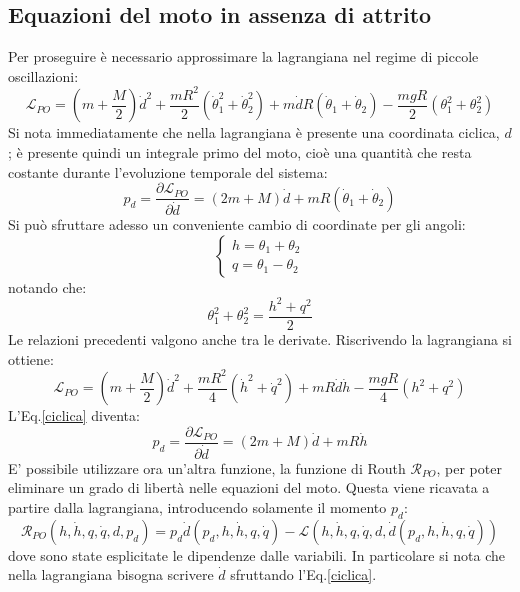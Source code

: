 \documentclass[11pt, a4paper, twoside]{article}
\begin{document}
\subsection{Equazioni del moto in assenza di attrito}
Per proseguire è necessario approssimare
la lagrangiana nel regime di piccole oscillazioni:
\begin{equation}
\mathcal{L}_{PO} =  \left(m+ \frac{M}{2}\right) \dot{d}^2 + \frac{m R^2}{2}  (\dot\theta_1^2 + \dot\theta_2^2) + m \dot{d} R (\dot \theta_1 + \dot \theta_2) - \frac{m gR}{2} (\theta_1^2 + \theta_2^2)
\label{lagrangianapo}
\end{equation}
Si nota immediatamente che nella lagrangiana è presente una coordinata ciclica, $d$; è presente
 quindi un integrale primo del moto, cioè una quantità che resta costante durante 
l'evoluzione temporale del sistema:
\begin{equation}
p_d = \frac{\partial \mathcal{L}_{PO}}{\partial \dot{d}} =(2m+M) \dot d + m R (\dot\theta_1 + \dot \theta_2)
\label{ciclica}
\end{equation}
Si può sfruttare adesso un conveniente cambio di coordinate per gli angoli:
\begin{equation}
\left\{\begin{array}{lr}
  h = \theta_1 + \theta_2 \\
  q = \theta_1 - \theta_2
\end{array}\right.
\label{definizionehq}
\end{equation}
notando che:
$$
  \theta_1^2 + \theta_2^2 = \frac{h^2 +q^2}{2}
$$ 
Le relazioni precedenti valgono anche tra le derivate.
Riscrivendo la lagrangiana si ottiene:
$$
\mathcal{L}_{PO} =  \left(m+ \frac{M}{2}\right) \dot{d}^2 + \frac{mR^2}{4}  (\dot{h}^2 + \dot{q}^2) + m  R \dot{d}\dot{h} - \frac{mgR}{4}(h^2 + q^2)
$$
L'Eq.\ref{ciclica} diventa:
\begin{equation*}
  p_d = \frac{\partial \mathcal{L}_{PO}}{\partial \dot{d}} =(2m+M) \dot d + m R \dot h
\end{equation*}
E' possibile utilizzare ora un'altra funzione, la funzione di Routh $\mathcal{R}_{PO}$, per poter eliminare 
un grado di libertà nelle equazioni del moto. Questa viene ricavata a partire dalla lagrangiana, introducendo solamente il
momento $p_d$:
$$
\mathcal{R}_{PO}(h,\dot h, q, \dot q, d, p_d )  = 
p_d \dot{d}(p_d, h,\dot h, q, \dot q)- \mathcal{L}(h,\dot h, q, \dot q, d, \dot{d}(p_d, h,\dot h, q, \dot q))
$$
dove sono state esplicitate le dipendenze dalle variabili. 
In particolare si nota che nella lagrangiana bisogna scrivere $\dot d$ sfruttando l'Eq.\ref{ciclica}.
\end{document}
